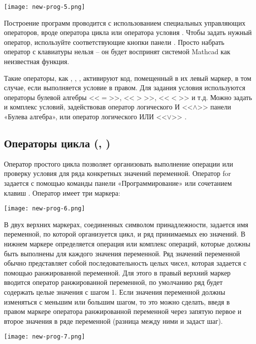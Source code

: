 \begin{center}
	\texttt{[image: new-prog-5.png]}
\end{center}

Построение программ проводится с использованием специальных управляющих операторов, вроде оператора цикла  или оператора условия . Чтобы задать нужный оператор, используйте соответствующие кнопки панели . Просто набрать оператор с клавиатуры нельзя – он будет воспринят системой Mathcad как неизвестная функция.

Такие операторы, как , , , активируют код, помещенный в их левый маркер, в том случае, если выполняется условие в правом. Для задания условия используются операторы булевой алгебры <<$=$>>, <<$>$>>, <<$<$>> и т.д. Можно задать и комплекс условий, задействовав оператор логического И <<$\land$>> панели «Булева алгебра», или оператор логического ИЛИ <<$\lor$>> .

\subsection*{Операторы цикла (, )}

Оператор простого цикла  позволяет организовать выполнение операции или проверку условия для ряда конкретных значений переменной. Оператор for задается с помощью команды панели «Программирование» или сочетанием клавиш . Оператор  имеет три маркера:
\begin{center}
	\texttt{[image: new-prog-6.png]}
\end{center}


В двух верхних маркерах, соединенных символом принадлежности, задается имя переменной, по которой организуется цикл, и ряд принимаемых ею значений. В нижнем маркере определяется операция или комплекс операций, которые должны быть выполнены для каждого значения переменной. Ряд значений переменной обычно представляет собой последовательность целых чисел, которая задается с помощью ранжированной переменной. Для этого в правый верхний маркер вводится оператор ранжированной переменной, по умолчанию ряд будет содержать целые значения с шагом 1. Если значения переменной должны изменяться с меньшим или большим шагом, то это можно сделать, введя в правом маркере оператора ранжированной переменной через запятую первое и второе значения в ряде переменной (разница между ними и задаст шаг).
\begin{center}
	\texttt{[image: new-prog-7.png]}
\end{center}


